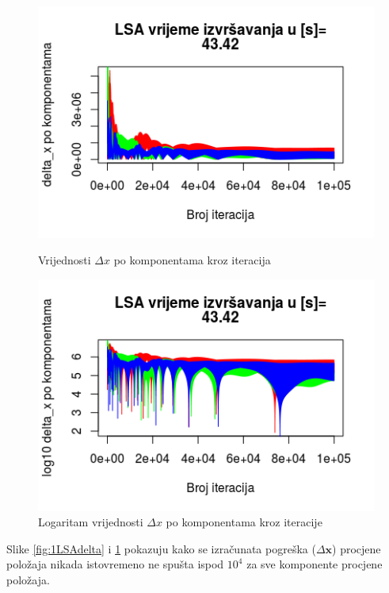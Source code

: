 \documentclass[a4paper,twoside,12pt]{memoir} %
\begin{document}
\begin{figure}[H]
	\begin{minipage}{0.48\textwidth}
		\centering
			\includegraphics[width=1\textwidth]{1LSAdelta}
		\caption{Vrijednosti $\Delta x$ po komponentama kroz iteracija}
		\label{fig:1LSAdelta}
	\end{minipage}%
	\hspace{1cm}
	\begin{minipage}{0.48\textwidth}
		
		\includegraphics[width=1\textwidth]{1LSAdeltal10}
		\caption{Logaritam vrijednosti $\Delta x$ po komponentama kroz iteracije}
		\label{fig:1LSAdeltal10}
	\end{minipage}%
\end{figure}
Slike \ref{fig:1LSAdelta} i \ref{fig:1LSAdeltal10} pokazuju kako se izračunata pogreška ($\Delta \mathbf{x}$) procjene položaja nikada istovremeno ne spušta ispod $10^4$ za sve komponente procjene položaja.
\end{document}
